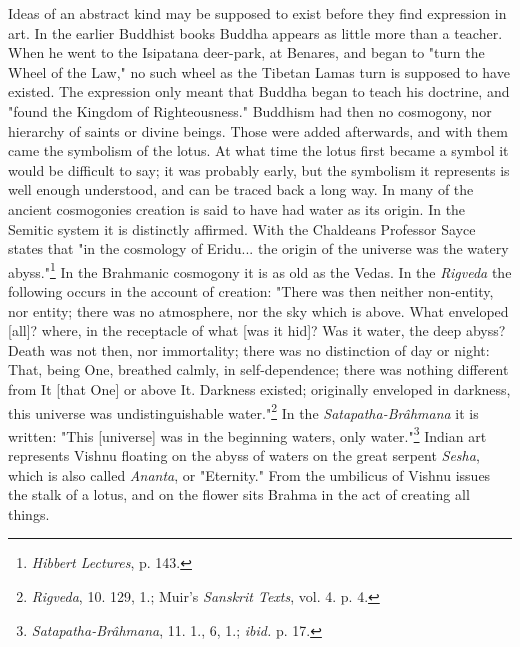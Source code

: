 \documentclass[a4paper, 11pt, oneside, polutonikogreek, english]{article}
\begin{document}
Ideas of an abstract kind may be supposed to exist before they find expression in art. In the earlier Buddhist books Buddha appears as little more than a teacher. When he went to the Isipatana deer-park, at Benares, and began to "turn the Wheel of the Law," no such wheel as the Tibetan Lamas turn is supposed to have existed. The expression only meant that Buddha began to teach his doctrine, and "found the Kingdom of Righteousness." Buddhism had then no cosmogony, nor hierarchy of saints or divine beings. Those were added afterwards, and with them came the symbolism of the lotus. At what time the lotus first became a symbol it would be difficult to say; it was probably early, but the symbolism it represents is well enough understood, and can be traced back a long way. In many of the ancient cosmogonies creation is said to have had water as its origin. In the Semitic system it is distinctly affirmed. With the Chaldeans Professor Sayce states that "in the cosmology of Eridu... the origin of the universe was the watery abyss."\footnote{\emph{Hibbert Lectures}, p. 143.} In the Brahmanic cosmogony it is as old as the Vedas. In the \emph{Rigveda} the following occurs in the account of creation: "There was then neither non-entity, nor entity; there was no atmosphere, nor the sky which is above. What enveloped [all]? where, in the receptacle of what [was it hid]? Was it water, the deep abyss? Death was not then, nor immortality; there was no distinction of day or night: That, being One, breathed calmly, in self-dependence; there was nothing different from It [that One] or above It. Darkness existed; originally enveloped in darkness, this universe was undistinguishable water."\footnote{\emph{Rigveda}, 10. 129, 1.; Muir's \emph{Sanskrit Texts}, vol. 4. p. 4.} In the \emph{Satapatha-Brâhmana} it is written: "This [universe] was in the beginning waters, only water."\footnote{\emph{Satapatha-Brâhmana}, 11. 1., 6, 1.; \emph{ibid.} p. 17.} Indian art represents Vishnu floating on the abyss of waters on the great serpent \emph{Sesha}, which is also called \emph{Ananta}, or "Eternity." From the umbilicus of Vishnu issues the stalk of a lotus, and on the flower sits Brahma in the act of creating all things.
\end{document}
